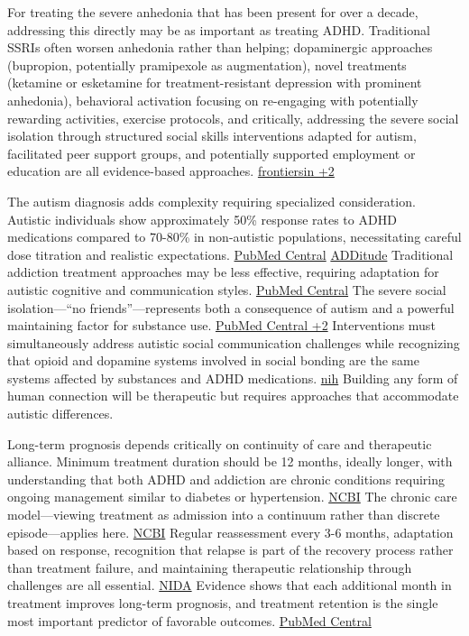 For treating the severe anhedonia that has been present for over a decade, addressing this directly may be as important as treating ADHD. Traditional SSRIs often worsen anhedonia rather than helping; dopaminergic approaches (bupropion, potentially pramipexole as augmentation), novel treatments (ketamine or esketamine for treatment-resistant depression with prominent anhedonia), behavioral activation focusing on re-engaging with potentially rewarding activities, exercise protocols, and critically, addressing the severe social isolation through structured social skills interventions adapted for autism, facilitated peer support groups, and potentially supported employment or education are all evidence-based approaches. \href{https://www.frontiersin.org/journals/psychiatry/articles/10.3389/fpsyt.2019.00311/full}{frontiersin +2}

The autism diagnosis adds complexity requiring specialized consideration. Autistic individuals show approximately 50\% response rates to ADHD medications compared to 70-80\% in non-autistic populations, necessitating careful dose titration and realistic expectations. \href{https://pmc.ncbi.nlm.nih.gov/articles/PMC3733520/}{PubMed Central} \href{https://www.additudemag.com/comorbid-conditions-with-adhd-treatment/}{ADDitude} Traditional addiction treatment approaches may be less effective, requiring adaptation for autistic cognitive and communication styles. \href{https://pmc.ncbi.nlm.nih.gov/articles/PMC9019324/}{PubMed Central} The severe social isolation---``no friends''---represents both a consequence of autism and a powerful maintaining factor for substance use. \href{https://pmc.ncbi.nlm.nih.gov/articles/PMC4295122/}{PubMed Central +2} Interventions must simultaneously address autistic social communication challenges while recognizing that opioid and dopamine systems involved in social bonding are the same systems affected by substances and ADHD medications. \href{https://pmc.ncbi.nlm.nih.gov/articles/PMC8259283/}{nih} Building any form of human connection will be therapeutic but requires approaches that accommodate autistic differences.

Long-term prognosis depends critically on continuity of care and therapeutic alliance. Minimum treatment duration should be 12 months, ideally longer, with understanding that both ADHD and addiction are chronic conditions requiring ongoing management similar to diabetes or hypertension. \href{https://www.ncbi.nlm.nih.gov/books/NBK64088/}{NCBI} The chronic care model---viewing treatment as admission into a continuum rather than discrete episode---applies here. \href{https://www.ncbi.nlm.nih.gov/books/NBK64088/}{NCBI} Regular reassessment every 3-6 months, adaptation based on response, recognition that relapse is part of the recovery process rather than treatment failure, and maintaining therapeutic relationship through challenges are all essential. \href{https://nida.nih.gov/publications/drugs-brains-behavior-science-addiction/treatment-recovery}{NIDA} Evidence shows that each additional month in treatment improves long-term prognosis, and treatment retention is the single most important predictor of favorable outcomes. \href{https://pmc.ncbi.nlm.nih.gov/articles/PMC4007701/}{PubMed Central}

